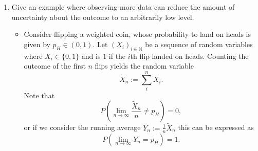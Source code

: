 \documentclass{article}
\begin{document}
\begin{enumerate}
	\item Give an example where observing more data can reduce the amount of uncertainty about the outcome to an arbitrarily low level.
	\begin{itemize}
		\item Consider flipping a weighted coin, whose probability to land on heads is given by $p_H \in (0, 1)$. Let $(X_i)_{i \in \mathbb{N}}$ be a sequence of random variables where $X_i \in \{0, 1\}$ and is $1$ if the $i$th flip landed on heads. Counting the outcome of the first $n$ flips yields the random variable
		$$
		\tilde{X}_n := \sum_{i}^n X_i.
		$$
		Note that
		$$
		P\left(\lim_{n \rightarrow \infty} \frac{\tilde{X}_n}{n} \neq p_H\right) = 0,
		$$
		or if we consider the running average $Y_n := \frac{1}{n} \tilde{X}_n$ this can be expressed as
		$$
		P\left(\lim_{n \rightarrow \infty} Y_n = p_H\right) = 1.
		$$
	\end{itemize}


\end{enumerate}
\end{document}
